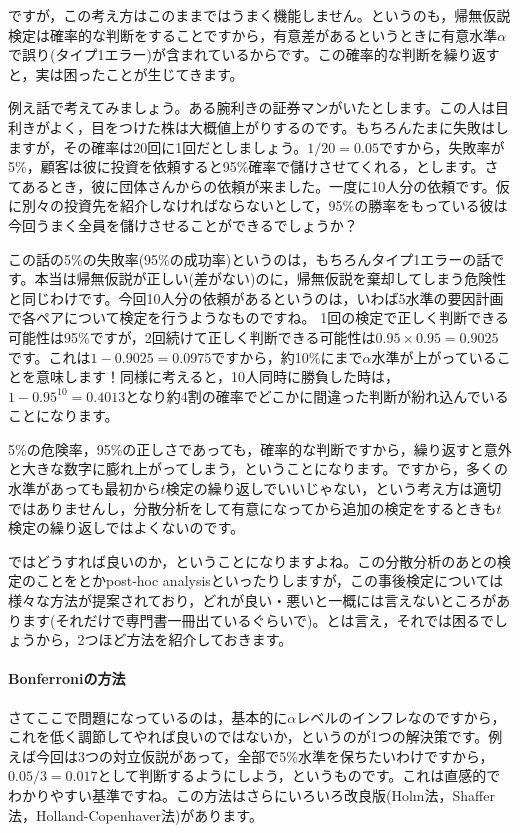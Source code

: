 \documentclass{ltjsarticle}
\begin{document}
ですが，この考え方はこのままではうまく機能しません。というのも，帰無仮説検定は確率的な判断をすることですから，有意差があるというときに有意水準$\alpha$で誤り(タイプ1エラー)が含まれているからです。この確率的な判断を繰り返すと，実は困ったことが生じてきます。

例え話で考えてみましょう。ある腕利きの証券マンがいたとします。この人は目利きがよく，目をつけた株は大概値上がりするのです。もちろんたまに失敗はしますが，その確率は20回に1回だとしましょう。$1/20=0.05$ですから，失敗率が5\%，顧客は彼に投資を依頼すると95\%確率で儲けさせてくれる，とします。さてあるとき，彼に団体さんからの依頼が来ました。一度に10人分の依頼です。仮に別々の投資先を紹介しなければならないとして，95\%の勝率をもっている彼は今回うまく全員を儲けさせることができるでしょうか？

この話の5\%の失敗率(95\%の成功率)というのは，もちろんタイプ1エラーの話です。本当は帰無仮説が正しい(差がない)のに，帰無仮説を棄却してしまう危険性と同じわけです。今回10人分の依頼があるというのは，いわば5水準の要因計画で各ペアについて検定を行うようなものですね。
1回の検定で正しく判断できる可能性は95\%ですが，2回続けて正しく判断できる可能性は$0.95\times0.95=0.9025$です。これは$1-0.9025=0.0975$ですから，約10\%にまで$\alpha$水準が上がっていることを意味します！同様に考えると，10人同時に勝負した時は，$1-0.95^{10}=0.4013$となり約4割の確率でどこかに間違った判断が紛れ込んでいることになります。

5\%の危険率，95\%の正しさであっても，確率的な判断ですから，繰り返すと意外と大きな数字に膨れ上がってしまう，ということになります。ですから，多くの水準があっても最初から$t$検定の繰り返しでいいじゃない，という考え方は適切ではありませんし，分散分析をして有意になってから追加の検定をするときも$t$検定の繰り返しではよくないのです。

ではどうすれば良いのか，ということになりますよね。この分散分析のあとの検定のことをとかpost-hoc analysisといったりしますが，この事後検定については様々な方法が提案されており，どれが良い・悪いと一概には言えないところがあります(それだけで専門書一冊出ているぐらいで\citep{BA33892274})。とは言え，それでは困るでしょうから，2つほど方法を紹介しておきます。

\paragraph{Bonferroniの方法}さてここで問題になっているのは，基本的に$\alpha$レベルのインフレなのですから，これを低く調節してやれば良いのではないか，というのが1つの解決策です。例えば今回は3つの対立仮説があって，全部で5\%水準を保ちたいわけですから，$0.05/3=0.017$として判断するようにしよう，というものです。これは直感的でわかりやすい基準ですね。この方法はさらにいろいろ改良版(Holm法，Shaffer	法，Holland-Copenhaver法)があります。
\end{document}
